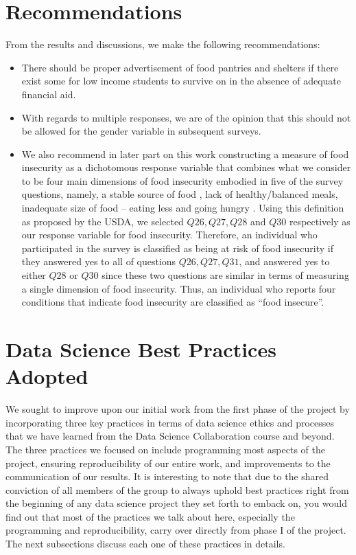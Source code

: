 \documentclass[
  10pt,
]{article}
\begin{document}
\hypertarget{recommendations}{%
\section{Recommendations}\label{recommendations}}

From the results and discussions, we make the following recommendations:

\begin{itemize}
\item
  There should be proper advertisement of food pantries and shelters if there exist some for low income students to survive on in the absence of adequate financial aid.
\item
  With regards to multiple responses, we are of the opinion that this should not be allowed for the gender variable in subsequent surveys.
\item
  We also recommend in later part on this work constructing a measure of food insecurity as a dichotomous response variable that combines what we consider to be four main dimensions of food insecurity embodied in five of the survey questions, namely, a stable source of food , lack of healthy/balanced meals, inadequate size of food -- eating less and going hungry . Using this definition as proposed by the USDA, we selected \(Q26, Q27, Q28\) and \(Q30\) respectively as our response variable for food insecurity. Therefore, an individual who participated in the survey is classified as being at risk of food insecurity if they answered yes to all of questions \(Q26, Q27, Q31\), and answered yes to either \(Q28\) or \(Q30\) since these two questions are similar in terms of measuring a single dimension of food insecurity. Thus, an individual who reports four conditions that indicate food insecurity are classified as ``food insecure''.
\end{itemize}

\hypertarget{data-science-best-practices-adopted}{%
\section{Data Science Best Practices Adopted}\label{data-science-best-practices-adopted}}

We sought to improve upon our initial work from the first phase of the project by incorporating three key practices in terms of data science ethics and processes that we have learned from the Data Science Collaboration course and beyond. The three practices we focused on include programming most aspects of the project, ensuring reproducibility of our entire work, and improvements to the communication of our results. It is interesting to note that due to the shared conviction of all members of the group to always uphold best practices right from the beginning of any data science project they set forth to emback on, you would find out that most of the practices we talk about here, especially the programming and reproducibility, carry over directly from phase I of the project. The next subsections discuss each one of these practices in details.
\end{document}
